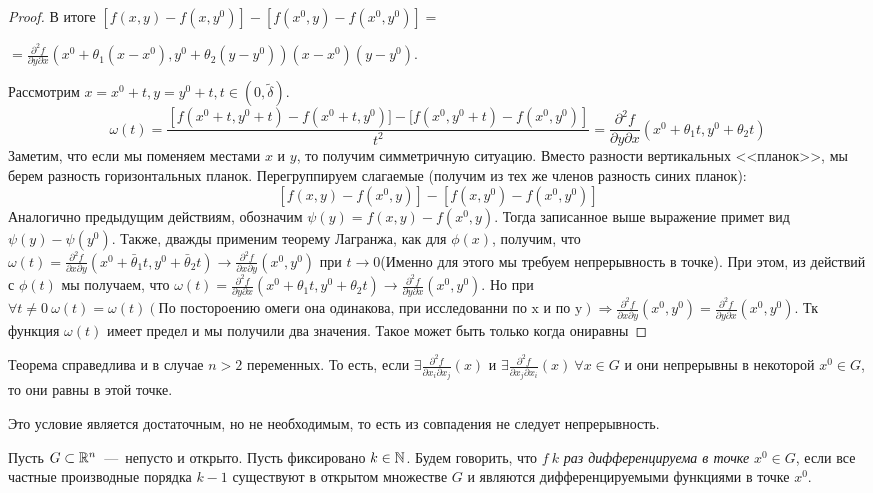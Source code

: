 \begin{proof}
    \noindent В итоге $\left[f(x, y) - f(x, y^0)\right] - \left[f(x^0, y) - f(x^0, y^0)\right] = $
    \begin{flushright}
    $ = \frac{\partial^2 f}{\partial y \partial x} \left(x^0 + \theta_1(x - x^0), y^0 + \theta_2(y - y^0)\right)(x - x^0)(y - y^0)$.
    \end{flushright}
    Рассмотрим $x = x^0 + t, y = y^0 + t, t \in (0, \widetilde{\delta})$. $$\omega(t) = \frac{\left[f(x^0 + t, y^0 + t) - f(x^0 + t, y^0)] - [f(x^0, y^0 + t) - f(x^0, y^0)\right]}{t^2} = \frac{\partial^2 f}{\partial y \partial x}(x^0 + \theta_1t, y^0 + \theta_2t)$$
    Заметим, что если мы поменяем местами $x$ и $y$, то получим симметричную ситуацию. Вместо разности вертикальных <<планок>>, мы берем разность горизонтальных планок. Перегруппируем слагаемые (получим из тех же членов разность синих планок): 
    $$[f(x, y) - f(x^0, y)] - [f(x, y^0) - f(x^0, y^0)]$$
    Аналогично предыдущим действиям, обозначим $\psi(y) = f(x, y) - f(x^0, y)$. Тогда записанное выше выражение примет вид $\psi(y) - \psi(y^0)$. Также, дважды применим теорему Лагранжа, как для $\phi(x)$, получим, что $\omega(t) = \frac{\partial^2 f}{\partial x \partial y}(x^0 + \bar \theta_1t, y^0 + \bar\theta_2t) \longrightarrow \frac{\partial^2f}{\partial x \partial y}(x^0, y^0)$ при $t \rightarrow 0$(Именно для этого мы требуем непрерывность в точке). При этом, из действий с $\phi(t)$ мы получаем, что $\omega(t) = \frac{\partial^2f}{\partial y \partial x}(x^0 + \theta_1 t, y^0 + \theta_2 t) \longrightarrow \frac{\partial^2f}{\partial y \partial x}(x^0, y^0)$. Но при $\forall t \neq 0 \ \omega(t) = \omega(t)(\text{По постороению омеги она одинакова, при исследованни по x и по y}) \Rightarrow \frac{\partial^2 f}{\partial x \partial y}(x^0, y^0) = \frac{\partial ^ 2 f}{\partial y \partial x}(x^0, y^0)$. Тк функция $\omega(t)$ имеет предел и мы получили два значения. Такое может быть только когда ониравны
\end{proof} 
\begin{note}
    Теорема справедлива и в случае $n > 2$ переменных. То есть, если $\exists \frac{\partial^2 f}{\partial x_i \partial x_j}(x)$ и $\exists \frac{\partial^2 f}{\partial x_j \partial x_i}(x) \ \forall x \in G$ и они непрерывны в некоторой $x^0 \in G$, то они равны в этой точке. 
\end{note}
\begin{note}
    Это условие является достаточным, но не необходимым, то есть из совпадения не следует непрерывность.
\end{note}
\begin{definition}
    Пусть $G \subset \mathbb{R}^n$~---~непусто и открыто. Пусть фиксировано $k \in \mathbb{N}$. Будем говорить, что $f \ k$ \textit{раз дифференцируема в точке} $x^0 \in G $, если все частные производные порядка $k - 1$ существуют в открытом множестве $G$ и являются дифференцируемыми функциями в точке $x^0$. 
\end{definition}